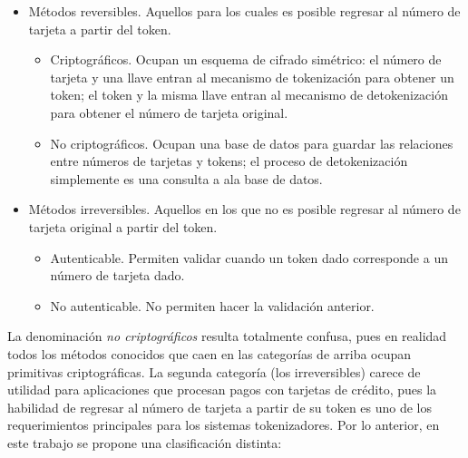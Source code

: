 \begin{itemize}
  \item Métodos reversibles. Aquellos para los cuales es posible regresar al
    número de tarjeta a partir del token.
    \begin{itemize}
      \item Criptográficos. Ocupan un esquema de cifrado simétrico: el número
        de tarjeta y una llave entran al mecanismo de tokenización para obtener
        un token; el token y la misma llave entran al mecanismo de
        detokenización para obtener el número de tarjeta original.
      \item No criptográficos. Ocupan una base de datos para guardar las
        relaciones entre números de tarjetas y tokens; el proceso de
        detokenización simplemente es una consulta a ala base de datos.
    \end{itemize}
  \item Métodos irreversibles. Aquellos en los que no es posible regresar al
    número de tarjeta original a partir del token.
    \begin{itemize}
      \item Autenticable. Permiten validar cuando un token dado corresponde a
        un número de tarjeta dado.
      \item No autenticable. No permiten hacer la validación anterior.
    \end{itemize}
\end{itemize}


La denominación \textit{no criptográficos} resulta totalmente confusa, pues en
realidad todos los métodos conocidos que caen en las categorías de arriba ocupan
primitivas criptográficas. La segunda categoría (los irreversibles) carece de
utilidad para aplicaciones que procesan pagos con tarjetas de crédito, pues la
habilidad de regresar al número de tarjeta a partir de su token es uno de los
requerimientos principales para los sistemas tokenizadores. Por lo anterior, en
este trabajo se propone una clasificación distinta:

